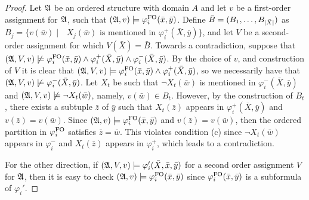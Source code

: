 \begin{proof}
	Let $\mathfrak{A}$ be an ordered structure with domain $A$ and let $v$ be a first-order assignment for $\mathfrak{A}$, such that $(\mathfrak{A},v)\models\varphi^{{\rm FO}}_i(\bar{x},\bar{y})$.
	Define $\bar{B} = (B_1,\ldots,B_{\vert \bar{X} \vert})$ as $B_j = \{v(\bar{w})\mid \text{ $X_j(\bar{w})$ is mentioned in $\varphi^{+}_i(\bar{X},\bar{y})$}\}$, and let $V$ be a second-order assignment for which $V(\bar{X}) = \bar{B}$.
	Towards a contradiction, suppose that $(\mathfrak{A},V,v)\not\models \varphi^{{\rm FO}}_i(\bar{x},\bar{y}) \wedge \varphi^{+}_i(\bar{X}, \bar{y}) \wedge \varphi^{-}_i(\bar{X},\bar{y})$.
	By the choice of $v$, and construction of $V$ it is clear that $(\mathfrak{A},V,v)\models\varphi^{{\rm FO}}_i(\bar{x},\bar{y})\wedge\varphi^{+}_i(\bar{X},\bar{y})$, so we necessarily have that $(\mathfrak{A},V,v)\not\models\varphi^{-}_i(\bar{X},\bar{y})$.
	Let $X_t$ be such that $\neg X_t(\bar{w})$ is mentioned in $\varphi^{-}_i(\bar{X},\bar{y})$ and $(\mathfrak{A},V, v)\not\models\neg X_t(\bar{w})$, namely, $v(\bar{w})\in B_t$. 
	However, by the construction of $B_t$, there exists a subtuple $\bar{z}$ of $\bar{y}$ such that $X_t(\bar{z})$ appears in $\varphi^{+}_i(\bar{X},\bar{y})$ and $v(\bar{z}) = v(\bar{w})$. Since $(\mathfrak{A},v)\models\varphi^{{\rm FO}}_i(\bar{x},\bar{y})$ and $v(\bar{z}) = v(\bar{w})$, then the ordered partition in $\varphi^{{\rm FO}}_i$ satisfies $\bar{z} = \bar{w}$. This violates condition (c) since $\neg X_t(\bar{w})$ appears in $\varphi^{-}_i$ and $X_t(\bar{z})$ appears in $\varphi^{+}_i$, which leads to a contradiction. 
	
	For the other direction, if $(\mathfrak{A},V,v)\models \varphi_i'(\bar{X},\bar{x}, \bar{y})$ for a second order assignment $V$ for $\mathfrak{A}$, then it is easy to check $(\mathfrak{A},v)\models\varphi^{{\rm FO}}_i(\bar{x},\bar{y})$ since $\varphi^{{\rm FO}}_i(\bar{x},\bar{y})$ is a subformula of $\varphi_i'$.
\end{proof}

